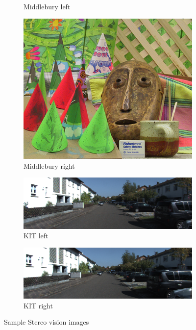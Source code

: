 \begin{figure}[!htbp]
\begin{subfigure}{.5\textwidth}
  \caption{Middlebury left}
  \label{fig:sfig3}
\end{subfigure}%
\begin{subfigure}{.5\textwidth}
  \centering
  \includegraphics[width=.8\linewidth]{figures/ConeR}
  \caption{Middlebury right}
  \label{fig:sfig4}
\end{subfigure}
\begin{subfigure}{.5\textwidth}
  \centering
  \includegraphics[width=.8\linewidth]{figures/RoadL}
  \caption{KIT left}
  \label{fig:sfig5}
\end{subfigure}%
\begin{subfigure}{.5\textwidth}
  \centering
  \includegraphics[width=.8\linewidth]{figures/RoadR}
  \caption{KIT right}
  \label{fig:sfig6}
\end{subfigure}
\caption{Sample Stereo vision images}
\label{fig:samplessv}
\end{figure}

